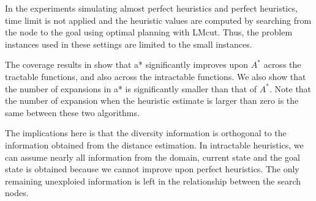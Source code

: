 In the experiments simulating almost perfect heuristics and perfect
heuristics, time limit is not applied and the heuristic values are computed by searching
from the node to the goal using optimal planning with LMcut. Thus, the
problem instances used in these settings are limited to the small instances.


The coverage results in  show that \*a* significantly improves upon $A^*$ across the tractable functions, and also across the intractable functions. We also show that the number of expansions in \*a* is significantly smaller than that of $A^*$. Note that the number of expansion when the heuristic estimate is larger than zero is the same between these two algorithms.

The implications here is that the diversity information is orthogonal to the information obtained from the distance estimation. In intractable heuristics, we can assume nearly all information from the domain, current state and the goal state is obtained because we cannot improve upon perfect heuristics. The only remaining unexploied information is left in the relationship between the search nodes.
